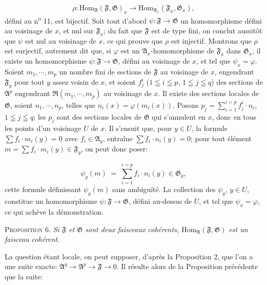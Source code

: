 \begin{equation*}
\rho : \mathrm{Hom}_{\mathfrak{A}}(\mathfrak{F}, \mathfrak{G})_x \to \mathrm{Hom}_{\mathfrak{A}_x}(\mathfrak{F}_x, \mathfrak{G}_x),
\end{equation*}
défini au n\textsuperscript{o} 11, est bijectif. Soit tout d'abord $\psi: \mathfrak{F} \to \mathfrak{G}$ un homomorphisme défini au voisinage de $x$, et nul sur $\mathfrak{F}_x$; du fait que $\mathfrak{F}$ est de type fini, on conclut aussitôt que $\psi$ est nul au voisinage de $x$, ce qui prouve que $\rho$ est injectif. Montrons que $\rho$ est surjectif, autrement dit que, si $\varphi$ est un $\mathfrak{A}_x$-homomorphisme de
$\mathfrak{F}_x$ dans $\mathfrak{G}_x$, il existe un homomorphisme $\psi: \mathfrak{F} \to \mathfrak{G}$, défini au voisinage de $x$, et tel que $\psi_x = \varphi$. Soient $m_1, \cdots, m_p$ un nombre fini de sections de $\mathfrak{F}$ au voisinage de $x$, engendrant $\mathfrak{F}_y$ pour tout $y$ assez voisin de $x$, et soient $f_j^i$ ($1 \leqq i \leqq p$, $1 \leqq j \leqq q$) des sections de $\mathfrak{A}^p$ engendrant $\mathfrak{R}(m_1, \cdots, m_p)$ au voisinage de $x$. Il existe des sections locales de $\mathfrak{G}$, soient $n_1, \cdots, n_p$, telles que $n_i(x) = \varphi(m_i(x))$. Posons $p_j = \sum_{i=1}^{i=p} f_j^i \cdot n_i$, $1 \leqq j \leqq q$; les $p_j$ sont des sections locales de $\mathfrak{G}$ qui s'annulent en $x$, donc en tous les points d'un voisinage $U$ de $x$. Il s'ensuit que, pour $y \in U$, la formule $\sum f_i \cdot m_i(y) = 0$ avec $f_i \in \mathfrak{A}_y$, entraîne $\sum f_i \cdot n_i(y) = 0$; pour tout élément $m = \sum f_i \cdot m_i(y) \in \mathfrak{F}_y$, on peut donc poser:

\begin{equation*}
\psi_y(m) \;=\; \sum_{i=1}^{i=p} f_i \cdot n_i(y) \in \mathfrak{G}_y ,
\end{equation*}
cette formule définissant $\psi_y(m)$ sans ambiguïté. La collection des $\psi_y$, $y \in U$, constitue un homomorphisme $\psi: \mathfrak{F} \to \mathfrak{G}$, défini au-dessus de $U$, et tel que $\psi_x = \varphi$, ce qui achève la démonstration.

\textsc{Proposition} 6. \emph{Si $\mathfrak{F}$ et $\mathfrak{G}$ sont deux faisceaux cohérents, $\mathrm{Hom}_{\mathfrak{A}}(\mathfrak{F}, \mathfrak{G})$ est un faisceau cohérent.}

La question étant locale, on peut supposer, d'après la Proposition 2, que l'on a une suite exacte: $\mathfrak{A}^q \to \mathfrak{A}^p \to \mathfrak{F} \to 0$. Il résulte alors de la Proposition précédente que la suite:

